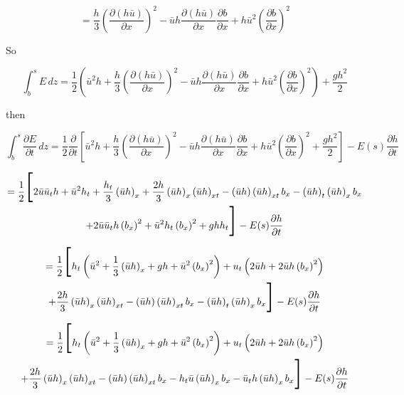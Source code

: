 \documentclass[12pt]{article}
\begin{document}
\[ = \frac{h}{3}\left( \frac{\partial \left(h\bar{u}\right)}{\partial x}\right)^2  - \bar{u}h  \frac{\partial \left(h\bar{u}\right)}{\partial x}\frac{\partial b}{\partial x}  + h\bar{u} ^2\left( \frac{\partial b}{\partial x} \right)^2 \]

So

\[\int_b^sE \, dz  = \frac{1}{2}\left(\bar{u}^2h + \frac{h}{3}\left( \frac{\partial \left(h\bar{u}\right)}{\partial x}\right)^2  - \bar{u}h  \frac{\partial \left(h\bar{u}\right)}{\partial x}\frac{\partial b}{\partial x}  + h\bar{u} ^2\left( \frac{\partial b}{\partial x} \right)^2 \right) + \frac{gh^2}{2} \]

then

\[\int_b^{s} \frac{\partial E}{\partial t} \, dz = \frac{1}{2}\frac{\partial}{\partial t}\left[\bar{u}^2h + \frac{h}{3}\left( \frac{\partial \left(h\bar{u}\right)}{\partial x}\right)^2  - \bar{u}h  \frac{\partial \left(h\bar{u}\right)}{\partial x}\frac{\partial b}{\partial x}  + h\bar{u} ^2\left( \frac{\partial b}{\partial x} \right)^2  + \frac{gh^2}{2}\right] - E(s)\frac{\partial h}{\partial t}  \]

\begin{multline}
= \frac{1}{2}\scalebox{3}{[} 2\bar{u}\bar{u}_th + \bar{u}^2h_t + \frac{h_t}{3}\left(\bar{u}h\right)_x + \frac{2h}{3}\left(\bar{u}h\right)_x\left(\bar{u}h\right)_{xt}    - \left(\bar{u}h \right)\left(\bar{u}h \right)_{xt}b_x - \left(\bar{u}h \right)_t\left(\bar{u}h \right)_{x}b_x \\   + 2\bar{u}\bar{u}_th\left(b_x \right)^2 + \bar{u}^2h_t \left(b_x \right)^2  + ghh_t\scalebox{3}{]} - E(s)\frac{\partial h}{\partial t}
\end{multline}

\begin{multline}
= \frac{1}{2}\scalebox{3}{[}h_t\left(\bar{u}^2 +  \frac{1}{3}\left(\bar{u}h\right)_x + gh + \bar{u}^2 \left(b_x \right)^2 \right) + u_t\left(2\bar{u} h  + 2\bar{u}h\left(b_x \right)^2\right) \\ + \frac{2h}{3}\left(\bar{u}h\right)_x\left(\bar{u}h\right)_{xt}    - \left(\bar{u}h \right)\left(\bar{u}h \right)_{xt}b_x - \left(\bar{u}h \right)_t\left(\bar{u}h \right)_{x}b_x \scalebox{3}{]} - E(s)\frac{\partial h}{\partial t}
\end{multline}

\begin{multline}
= \frac{1}{2}\scalebox{3}{[}h_t\left(\bar{u}^2 +  \frac{1}{3}\left(\bar{u}h\right)_x + gh + \bar{u}^2 \left(b_x \right)^2 \right) + u_t\left(2\bar{u} h  + 2\bar{u}h\left(b_x \right)^2\right) \\ + \frac{2h}{3}\left(\bar{u}h\right)_x\left(\bar{u}h\right)_{xt}    - \left(\bar{u}h \right)\left(\bar{u}h \right)_{xt}b_x - h_t\bar{u}\left(\bar{u}h \right)_{x}b_x - \bar{u}_th\left(\bar{u}h \right)_{x}b_x \scalebox{3}{]} - E(s)\frac{\partial h}{\partial t}
\end{multline}
\end{document}
